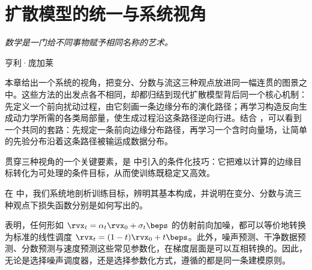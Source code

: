 \chapter{扩散模型的统一与系统视角}\label{ch:all-equivalent}

\epigraph{
    \textit{数学是一门给不同事物赋予相同名称的艺术。
}}{亨利·庞加莱}

本章给出一个系统的视角，把变分、分数与流这三种观点放进同一幅连贯的图景之中。这些方法的出发点各不相同，却都归结到现代扩散模型背后同一个核心机制：先定义一个前向扰动过程，由它刻画一条边缘分布的演化路径；再学习构造反向生成动力学所需的各类局部量，使生成过程沿这条路径逆向行进。结合 ，可以看到一个共同的套路：先规定一条前向边缘分布路径，再学习一个含时向量场，让简单的先验分布沿着这条路径被输运成数据分布。

贯穿三种视角的一个关键要素，是  中引入的条件化技巧：它把难以计算的边缘目标转化为可处理的条件目标，从而使训练既稳定又高效。

在  中，我们系统地剖析训练目标，辨明其基本构成，并说明在变分、分数与流三种观点下损失函数分别是如何写出的。


 表明，任何形如 $\rvx_t = \alpha_t \rvx_0 + \sigma_t \beps$ 的仿射前向加噪，都可以等价地转换为标准的线性调度 $\rvx_t = (1 - t)\rvx_0 + t\beps$。此外，噪声预测、干净数据预测、分数预测与速度预测这些常见参数化，在梯度层面是可以互相转换的。因此，无论是选择噪声调度器，还是选择参数化方式，遵循的都是同一条建模原则。


